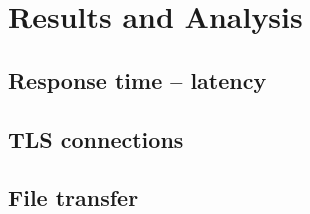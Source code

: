 \chapter{Results and Analysis}\label{chap:results}

\section{Response time -- latency}

\section{TLS connections}

\section{File transfer}

